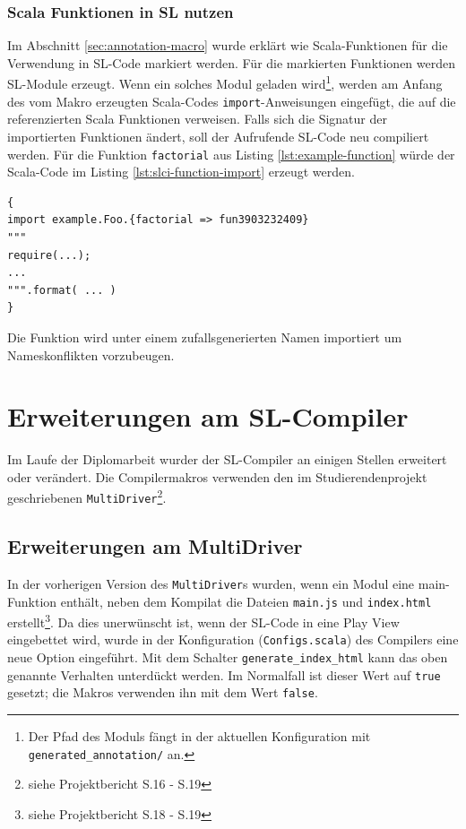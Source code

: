 \documentclass[12pt]{scrreprt}
\begin{document}
\subsection{Scala Funktionen in SL nutzen}

Im Abschnitt \ref{sec:annotation-macro} wurde erklärt wie Scala-Funktionen für die Verwendung in \ac{SL}-Code markiert werden. Für die markierten Funktionen werden \ac{SL}-Module erzeugt. Wenn ein solches Modul geladen wird\footnote{Der Pfad des Moduls fängt in der aktuellen Konfiguration mit \lstinline!generated_annotation/! an.}, werden am Anfang des vom Makro erzeugten Scala-Codes \lstinline!import!-Anweisungen eingefügt, die auf die referenzierten Scala Funktionen verweisen. Falls sich die Signatur der importierten Funktionen ändert, soll der Aufrufende SL-Code neu compiliert werden.
Für die Funktion \lstinline!factorial! aus Listing \ref{lst:example-function} würde der Scala-Code im Listing \ref{lst:slci-function-import} erzeugt werden.

\begin{lstlisting}[caption={Scala \lstinline!import!-Anweisung für eine annotierte Funktion}, label=lst:slci-function-import, float=h]
{
import example.Foo.{factorial => fun3903232409}
"""
require(...);
...
""".format( ... )
}
\end{lstlisting}

Die Funktion wird unter einem zufallsgenerierten Namen importiert um Nameskonflikten vorzubeugen.

\chapter{Erweiterungen am SL-Compiler}
\label{chap:dom-monad-extensions}

Im Laufe der Diplomarbeit wurder der \ac{SL}-Compiler an einigen Stellen erweitert oder verändert. Die Compilermakros verwenden den im Studierendenprojekt geschriebenen \lstinline!MultiDriver!\footnote{siehe Projektbericht S.16 - S.19}. 

\section{Erweiterungen am MultiDriver}

In der vorherigen Version des \lstinline!MultiDriver!s wurden, wenn ein Modul eine main-Funktion enthält, neben dem Kompilat die Dateien \lstinline!main.js! und \lstinline!index.html! erstellt\footnote{siehe Projektbericht S.18 - S.19}. Da dies unerwünscht ist, wenn der \ac{SL}-Code in eine Play View eingebettet wird, wurde in der Konfiguration (\lstinline!Configs.scala!) des Compilers eine neue Option eingeführt.
Mit dem Schalter \lstinline!generate_index_html! kann das oben genannte Verhalten unterdückt werden. Im Normalfall ist dieser Wert auf \lstinline!true! gesetzt; die Makros verwenden ihn mit dem Wert \lstinline!false!.
\end{document}
